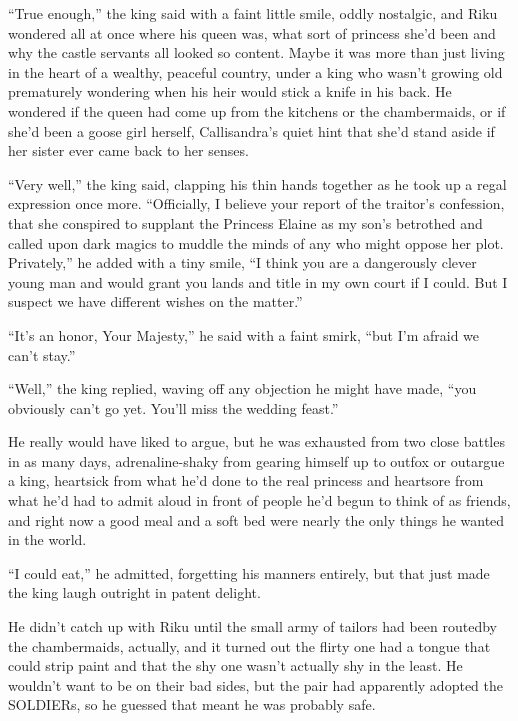 ``True enough,'' the king said with a faint little smile, oddly nostalgic, and Riku wondered all at once where his queen was, what sort of princess she'd been and why the castle servants all looked so content. Maybe it was more than just living in the heart of a wealthy, peaceful country, under a king who wasn't growing old prematurely wondering when his heir would stick a knife in his back. He wondered if the queen had come up from the kitchens or the chambermaids, or if she'd been a goose girl herself, Callisandra's quiet hint that she'd stand aside if her sister ever came back to her senses.

``Very well,'' the king said, clapping his thin hands together as he took up a regal expression once more. ``Officially, I believe your report of the traitor's confession, that she conspired to supplant the Princess Elaine as my son's betrothed and called upon dark magics to muddle the minds of any who might oppose her plot. Privately,'' he added with a tiny smile, ``I think you are a dangerously clever young man and would grant you lands and title in my own court if I could. But I suspect we have different wishes on the matter.''

``It's an honor, Your Majesty,'' he said with a faint smirk, ``but I'm afraid we can't stay.''

``Well,'' the king replied, waving off any objection he might have made, ``you obviously can't go yet. You'll miss the wedding feast.''

He really would have liked to argue, but he was exhausted from two close battles in as many days, adrenaline-shaky from gearing himself up to outfox or outargue a king, heartsick from what he'd done to the real princess and heartsore from what he'd had to admit aloud in front of people he'd begun to think of as friends, and right now a good meal and a soft bed were nearly the only things he wanted in the world.

``I could eat,'' he admitted, forgetting his manners entirely, but that just made the king laugh outright in patent delight.


\scenechange


He didn't catch up with Riku until the small army of tailors had been routed\textemdash by the chambermaids, actually, and it turned out the flirty one had a tongue that could strip paint and that the shy one wasn't actually shy in the least. He wouldn't want to be on their bad sides, but the pair had apparently adopted the SOLDIERs, so he guessed that meant he was probably safe.

